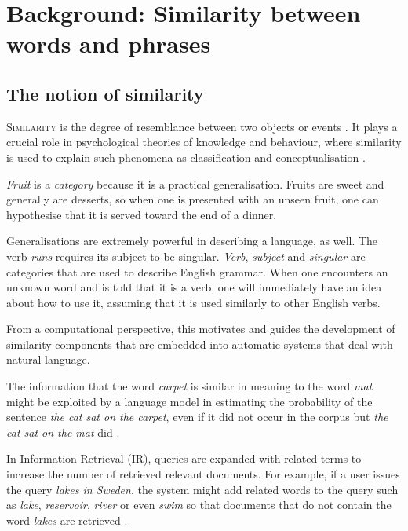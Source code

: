\chapter{Background: Similarity between words and phrases}
\label{cha:background}

\section{The notion of similarity}
\label{sec:similarity}

\lettrine[lines=5,loversize=0.25]{S}{imilarity} is the degree of resemblance between two objects or events \cite{WCS:WCS1282}. It plays a crucial role in psychological theories of knowledge and behaviour, where similarity is used to explain such phenomena as classification and conceptualisation \cite{Tversky1977,1986-13502-00119860101,medin1993respects,Markman1996,hahn1997concepts}.

\textit{Fruit} is a \emph{category} because it is a practical generalisation. Fruits are sweet and generally are desserts, so when one is presented with an unseen fruit, one can hypothesise that it is served toward the end of a dinner.

Generalisations are extremely powerful in describing a language, as well. The verb \textit{runs} requires its subject to be singular. \textit{Verb}, \textit{subject} and \textit{singular} are categories that are used to describe English grammar. When one encounters an unknown word and is told that it is a verb, one will immediately have an idea about how to use it, assuming that it is used similarly to other English verbs.

From a computational perspective, this motivates and guides the development of similarity components that are embedded into automatic systems that deal with natural language.

The information that the word \textit{carpet} is similar in meaning to the word \textit{mat} might be exploited by a language model in estimating the probability of the sentence \textit{the cat sat on the carpet}, even if it did not occur in the corpus but \textit{the cat sat on the mat} did \cite{bengio2006}.

In Information Retrieval (IR), queries are expanded with related terms to increase the number of retrieved relevant documents. For example, if a user issues the query \textit{lakes in Sweden}, the system might add related words to the query such as \textit{lake}, \textit{reservoir}, \textit{river} or even \textit{swim} so that documents that do not contain the word \textit{lakes} are retrieved \cite{Xu:1996:QEU:243199.243202}.


